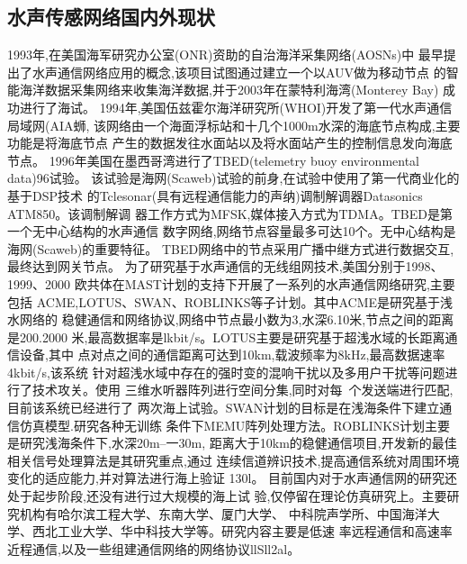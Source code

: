 \subsection{水声传感网络国内外现状}
1993年,在美国海军研究办公室(ONR)资助的自治海洋采集网络(AOSNs)中
最早提出了水声通信网络应用的概念,该项目试图通过建立一个以AUV做为移动节点
的智能海洋数据采集网络来收集海洋数据,并于2003年在蒙特利海湾(Monterey Bay)
成功进行了海试。
1994年,美国伍兹霍尔海洋研究所(WHOI)开发了第一代水声通信局域网(AIA蛳,
该网络由一个海面浮标站和十几个1000m水深的海底节点构成,主要功能是将海底节点
产生的数据发往水面站以及将水面站产生的控制信息发向海底节点。
1996年美国在墨西哥湾进行了TBED(telemetry buoy
environmental data)96试验。
该试验是海网(Scaweb)试验的前身,在试验中使用了第一代商业化的基于DSP技术
的Tclesonar(具有远程通信能力的声纳)调制解调器Datasonics ATM850。该调制解调
器工作方式为MFSK,媒体接入方式为TDMA。TBED是第一个无中心结构的水声通信
数字网络,网络节点容量最多可达10个。无中心结构是海网(Scaweb)的重要特征。
TBED网络中的节点采用广播中继方式进行数据交互,最终达到网关节点。
为了研究基于水声通信的无线组网技术,美国分别于1998、1999、2000
欧共体在MAST计划的支持下开展了一系列的水声通信网络研究,主要包括
ACME,LOTUS、SWAN、ROBLINKS等子计划。其中ACME是研究基于浅水网络的
稳健通信和网络协议,网络中节点最小数为3,水深6.10米,节点之间的距离是200.2000
米,最高数据率是lkbit/s。LOTUS主要是研究基于超浅水域的长距离通信设备,其中
点对点之间的通信距离可达到10km,载波频率为8kHz,最高数据速率4kbit/s,该系统
针对超浅水域中存在的强时变的混响干扰以及多用户干扰等问题进行了技术攻关。使用
三维水听器阵列进行空间分集,同时对每~个发送端进行匹配,目前该系统已经进行了
两次海上试验。SWAN计划的目标是在浅海条件下建立通信仿真模型.研究各种无训练
条件下MEMU阵列处理方法。ROBLINKS计划主要是研究浅海条件下,水深20m--一30m,
距离大于10km的稳健通信项目,开发新的最佳相关信号处理算法是其研究重点,通过
连续信道辨识技术,提高通信系统对周围环境变化的适应能力,并对算法进行海上验证
130l。
目前国内对于水声通信网的研究还处于起步阶段,还没有进行过大规模的海上试
验,仅停留在理论仿真研究上。主要研究机构有哈尔滨工程大学、东南大学、厦门大学、
中科院声学所、中国海洋大学、西北工业大学、华中科技大学等。研究内容主要是低速
率远程通信和高速率近程通信,以及一些组建通信网络的网络协议llSll2al。
